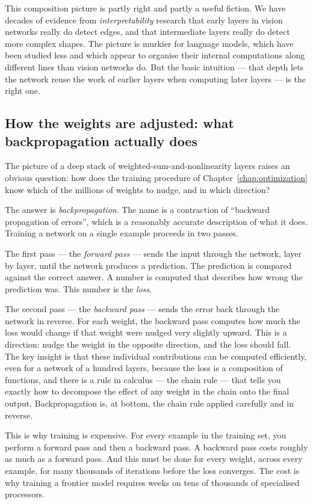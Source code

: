 This composition picture is partly right and partly a useful
fiction. We have decades of evidence from \emph{interpretability}
research that early layers in vision networks really do detect
edges, and that intermediate layers really do detect more
complex shapes. The picture is murkier for language models,
which have been studied less and which appear to organise their
internal computations along different lines than vision
networks do. But the basic intuition --- that depth lets the
network reuse the work of earlier layers when computing later
layers --- is the right one.

\subsection*{How the weights are adjusted: what backpropagation
actually does}

The picture of a deep stack of weighted-sum-and-nonlinearity
layers raises an obvious question: how does the training
procedure of Chapter~\ref{chap:optimization} know which of the millions of weights
to nudge, and in which direction?

The answer is \emph{backpropagation}. The name is a contraction
of ``backward propagation of errors'', which is a reasonably
accurate description of what it does. Training a network on a
single example proceeds in two passes.

The first pass --- the \emph{forward pass} --- sends the input
through the network, layer by layer, until the network produces
a prediction. The prediction is compared against the correct
answer. A number is computed that describes how wrong the
prediction was. This number is the \emph{loss}.

The second pass --- the \emph{backward pass} --- sends the
error back through the network in reverse. For each weight,
the backward pass computes how much the loss would change if
that weight were nudged very slightly upward. This is a
direction: nudge the weight in the opposite direction, and
the loss should fall. The key insight is that these individual
contributions can be computed efficiently, even for a network
of a hundred layers, because the loss is a composition of
functions, and there is a rule in calculus --- the chain rule
--- that tells you exactly how to decompose the effect of any
weight in the chain onto the final output. Backpropagation
is, at bottom, the chain rule applied carefully and in reverse.

This is why training is expensive. For every example in the
training set, you perform a forward pass and then a backward
pass. A backward pass costs roughly as much as a forward pass.
And this must be done for every weight, across every example,
for many thousands of iterations before the loss converges.
The cost is why training a frontier model requires weeks on
tens of thousands of specialised processors.

